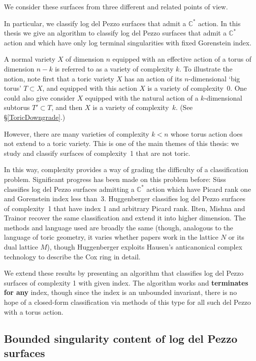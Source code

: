 \documentclass[12pt,a4paper]{book}      %
\theoremstyle{definition}
\newcommand{\mb}[1]{\mathbb{#1}}
\begin{document}
We consider these surfaces from three different and related points of view.

In particular, we classify log del Pezzo surfaces that admit a $\mb{C}^*$ action.
In this thesis we give an algorithm to classify log del Pezzo surfaces that admit a $\mb{C}^*$ action and which have only log terminal singularities with fixed Gorenstein index. 


A normal variety $X$ of dimension $n$ equipped with an effective action of a torus of dimension $n-k$ is referred to as a variety of complexity $k$. To illustrate the notion, note first that a toric variety $X$ has an action of its $n$-dimensional `big torus' $T\subset X$, and equipped with this action $X$ is a variety of complexity~0.
One could also give consider $X$ equipped with the natural action of a $k$-dimensional
subtorus $T'\subset T$, and then $X$ is a variety of complexity~$k$. (See \S\ref{ToricDowngrade}.)

However, there are many varieties of complexity $k<n$ whose torus action does not extend to a toric variety. This is one of the main themes of this thesis: we study
and classify surfaces of complexity~1 that are not toric.

In this way, complexity provides a way of grading the difficulty of a classification problem. Significant progress has been made on this problem before: S\"{u}ss \cite{Suss} classifies log del Pezzo surfaces admitting a $\mb{C}^*$ action which have Picard rank one and Gorenstein index less than~3. Huggenberger \cite{Huggenberger} classifies log del Pezzo surfaces of complexity~1 that have index 1 and arbitrary Picard rank. Ilten, Mishna and Trainor \cite{IMT} recover the same classification and extend it into higher dimension. The methods and language used are broadly the same (though, analogous to the language of toric geometry, it varies whether papers work in the lattice $N$ or its dual lattice $M$), though Huggenberger exploits Hausen's anticanonical complex technology to describe the Cox ring in detail. 

We extend these results by presenting an algorithm that classifies
log del Pezzo surfaces of complexity 1 with given index.
The algorithm works and \textbf{terminates for any} index, 
though since the index is an unbounded invariant, there is no hope of 
a closed-form classification via methods of this type for all such del Pezzo with a torus action.



\subsection{Bounded singularity content of log del Pezzo surfaces}
\end{document}
